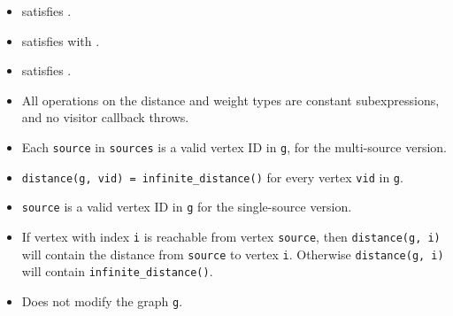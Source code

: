 \begin{itemdescr}
      \pnum\mandates
            \begin{itemize}
                  \item {} satisfies .
                  \item {} satisfies 
                        with .
                  \item {} satisfies .
            \end{itemize}
      \pnum\constantwhen
            \begin{itemize}
                  \item All operations on the distance and weight types
                        are constant subexpressions, and no visitor callback throws.
            \end{itemize}
      \pnum\preconditions
            \begin{itemize}
                  \item
                        Each \lstinline{source} in \lstinline{sources} is a valid vertex ID in \lstinline{g},
                        for the multi-source version.
                  \item
                        \lstinline{distance(g, vid) = infinite_distance()} for every vertex \lstinline{vid} in \lstinline{g}.
            \end{itemize}
      \pnum\hardprecond
            \begin{itemize}
                  \item
                        \lstinline{source} is a valid vertex ID in \lstinline{g} for the single-source version.
            \end{itemize}
      \pnum\effects
            \begin{itemize}
                  \item
                        If vertex with index \lstinline{i} is reachable from vertex \lstinline{source}, then
                        \lstinline{distance(g, i)} will contain the distance from \lstinline{source} to vertex
                        \lstinline{i}.  Otherwise \lstinline{distance(g, i)} will contain
                        \lstinline{infinite_distance()}.
                  \item Does not modify the graph \lstinline{g}.

\end{itemize}
\end{itemdescr}
